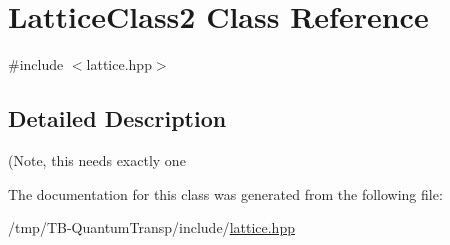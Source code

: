 \hypertarget{classLatticeClass2}{}\section{Lattice\+Class2 Class Reference}
\label{classLatticeClass2}


{\ttfamily \#include $<$lattice.\+hpp$>$}



\subsection{Detailed Description}
(Note, this needs exactly one 

The documentation for this class was generated from the following file\+:\begin{DoxyCompactItemize}
\item 
/tmp/\+T\+B-\/\+Quantum\+Transp/include/\hyperlink{lattice_8hpp}{lattice.\+hpp}\end{DoxyCompactItemize}
